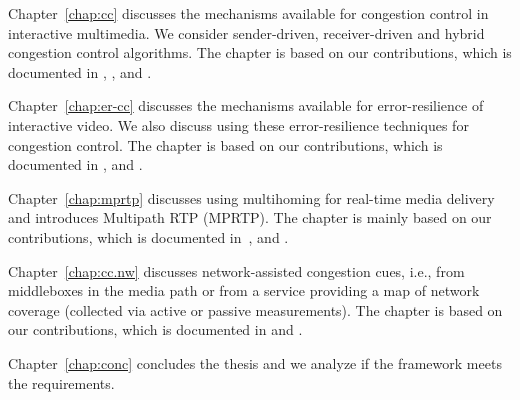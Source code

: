 
Chapter~\ref{chap:cc} discusses the mechanisms available for congestion
control in interactive multimedia. We consider sender-driven, receiver-driven
and hybrid congestion control algorithms. The chapter is based on our
contributions, which is documented in , ,
\cite{singh:2010.thesis} and .


Chapter~\ref{chap:er-cc} discusses the mechanisms available for
error-resilience of interactive video. We also discuss using these
error-resilience techniques for congestion control. The chapter is based on
our contributions, which is documented in , and
.


Chapter~\ref{chap:mprtp} discusses using multihoming for real-time media
delivery and introduces Multipath RTP (MPRTP). The chapter is mainly based on
our contributions, which is documented in~\cite{draft.mprtp, draft.mprtp.sdp,
Globisch:AsymGrpComm, draft.rtcp.overlay}, and .



Chapter~\ref{chap:cc.nw} discusses network-assisted congestion cues, i.e.,
from middleboxes in the media path or from a service providing a map of
network coverage (collected via active or passive measurements). The chapter
is based on our contributions, which is documented in  and
\cite{glass:patent}.


Chapter~\ref{chap:conc} concludes the thesis and we analyze if the framework
meets the requirements.
